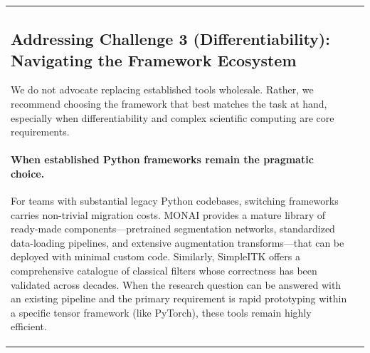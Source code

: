 \documentclass[10pt,letterpaper]{article}
\begin{document}
\begin{table}[H]
\begin{tabular}{|p{}|p{}|}
\subsection*{Addressing Challenge 3 (Differentiability): Navigating the Framework Ecosystem}
We do not advocate replacing established tools wholesale. Rather, we recommend choosing the framework that best matches the task at hand, especially when differentiability and complex scientific computing are core requirements.

\paragraph{When established Python frameworks remain the pragmatic choice.}
For teams with substantial legacy Python codebases, switching frameworks carries non-trivial migration costs. MONAI provides a mature library of ready-made components---pretrained segmentation networks, standardized data-loading pipelines, and extensive augmentation transforms---that can be deployed with minimal custom code. Similarly, SimpleITK offers a comprehensive catalogue of classical filters whose correctness has been validated across decades. When the research question can be answered with an existing pipeline and the primary requirement is rapid prototyping within a specific tensor framework (like PyTorch), these tools remain highly efficient.


\end{tabular}
\end{table}
\end{document}
